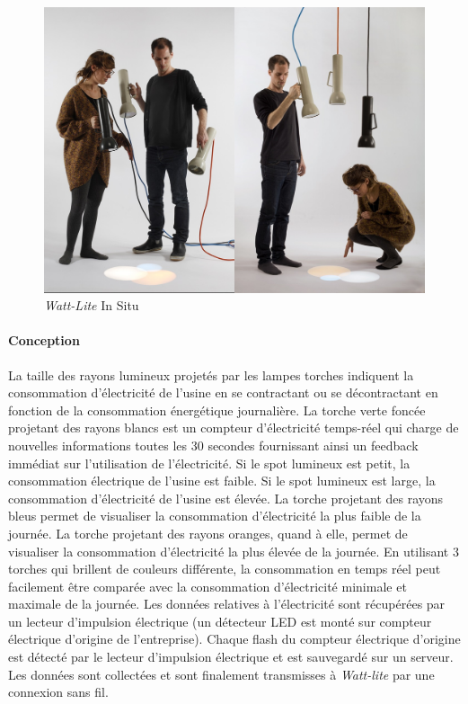 \documentclass[10pt,a5paper,twoside]{article}
\begin{document}
\begin{figure}
\centering
\includegraphics[]{images/wattlite-screenshot1.jpg}
\caption{\emph{Watt-Lite} In Situ}\label{fig:wattlite1}
\end{figure}

\paragraph{Conception}\label{conception-8}

La taille des rayons lumineux projetés par les lampes torches indiquent
la consommation d'électricité de l'usine en se contractant ou se
décontractant en fonction de la consommation énergétique journalière. La
torche verte foncée projetant des rayons blancs est un compteur
d'électricité temps-réel qui charge de nouvelles informations toutes les
30 secondes fournissant ainsi un feedback immédiat sur l'utilisation de
l'électricité. Si le spot lumineux est petit, la consommation électrique
de l'usine est faible. Si le spot lumineux est large, la consommation
d'électricité de l'usine est élevée. La torche projetant des rayons
bleus permet de visualiser la consommation d'électricité la plus faible
de la journée. La torche projetant des rayons oranges, quand à elle,
permet de visualiser la consommation d'électricité la plus élevée de la
journée. En utilisant 3 torches qui brillent de couleurs différente, la
consommation en temps réel peut facilement être comparée avec la
consommation d'électricité minimale et maximale de la journée. Les
données relatives à l'électricité sont récupérées par un lecteur
d'impulsion électrique (un détecteur LED est monté sur compteur
électrique d'origine de l'entreprise). Chaque flash du compteur
électrique d'origine est détecté par le lecteur d'impulsion électrique
et est sauvegardé sur un serveur. Les données sont collectées et sont
finalement transmisses à \emph{Watt-lite} par une connexion sans fil.
\end{document}
